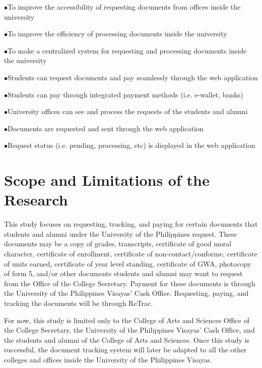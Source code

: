 \begin{description}
    \item $\bullet$To improve the accessibility of requesting documents from offices inside the university
    \item $\bullet$To improve the efficiency of processing documents inside the university
    \item $\bullet$To make a centralized system for requesting and processing documents inside the university
    \begin{description}
        \item $\bullet$Students can request documents and pay seamlessly through the web application
        \item $\bullet$Students can pay through integrated payment methods (i.e. e-wallet, banks)
        \item $\bullet$University offices can see and process the requests of the students and alumni
        \item $\bullet$Documents are requested and sent through the web application
        \item $\bullet$Request status (i.e. pending, processing, etc) is displayed in the web application

    \end{description}
    
\end{description}


\section{Scope and Limitations of the Research}
\label{sec:scopelimitations}

This study focuses on requesting, tracking, and paying for certain documents that students and alumni under the University of the Philippines request. These documents may be a copy of grades, transcripts, certificate of good moral character, certificate of enrollment, certificate of non-contact/conforme, certificate of units earned, certificate of year level standing, certificate of GWA, photocopy of form 5, and/or other documents students and alumni may want to request from the Office of the College Secretary. Payment for these documents is through the University of the Philippines Visayas’ Cash Office. Requesting, paying, and tracking the documents will be through ReTrac.

For now, this study is limited only to the College of Arts and Sciences Office of the College Secretary, the University of the Philippines Visayas’ Cash Office, and the students and alumni of the College of Arts and Sciences. Once this study is successful, the document tracking system will later be adapted to all the other colleges and offices inside the University of the Philippines Visayas. 



